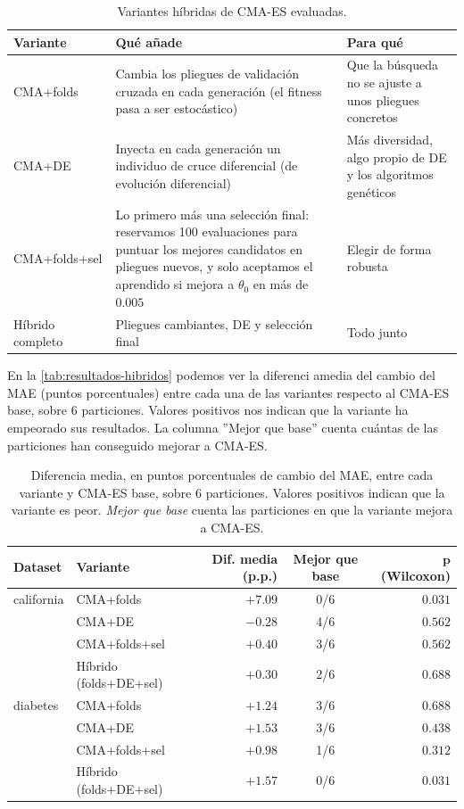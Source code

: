 \begin{table}[h]
\centering
\begin{tabular}{p{2.6cm}p{6.8cm}p{3.6cm}}
\hline
\textbf{Variante} & \textbf{Qué añade} & \textbf{Para qué} \\
\hline
CMA+folds & Cambia los pliegues de validación cruzada en cada generación (el fitness pasa a ser estocástico) & Que la búsqueda no se ajuste a unos pliegues concretos \\
\hline
CMA+DE & Inyecta en cada generación un individuo de cruce diferencial (de evolución diferencial) & Más diversidad, algo propio de DE y los algoritmos genéticos \\
\hline
CMA+folds+sel & Lo primero más una selección final: reservamos 100 evaluaciones para puntuar los mejores candidatos en pliegues nuevos, y solo aceptamos el aprendido si mejora a $\theta_0$ en más de $0.005$ & Elegir de forma robusta \\
\hline
Híbrido completo & Pliegues cambiantes, DE y selección final & Todo junto \\
\hline
\end{tabular}
\caption{Variantes híbridas de CMA-ES evaluadas.}
\label{tab:variantes-hibridas}
\end{table}

En la \autoref{tab:resultados-hibridos} podemos ver la diferenci amedia del cambio del MAE (puntos porcentuales) entre cada una de las variantes respecto al CMA-ES base, sobre 6 particiones. Valores positivos nos indican que la variante ha empeorado sus resultados. La columna ''Mejor que base'' cuenta cuántas de las particiones han conseguido mejorar a CMA-ES. 

\begin{table}[h]
\centering
\begin{tabular}{llrcr}
\hline
\textbf{Dataset} & \textbf{Variante} & \textbf{Dif. media (p.p.)} & \textbf{Mejor que base} & $\boldsymbol{p}$ \textbf{(Wilcoxon)} \\
\hline
california & CMA+folds              & $+7.09$ & 0/6 & $0.031$ \\
           & CMA+DE                 & $-0.28$ & 4/6 & $0.562$ \\
           & CMA+folds+sel          & $+0.40$ & 3/6 & $0.562$ \\
           & Híbrido (folds+DE+sel) & $+0.30$ & 2/6 & $0.688$ \\
\hline
diabetes   & CMA+folds              & $+1.24$ & 3/6 & $0.688$ \\
           & CMA+DE                 & $+1.53$ & 3/6 & $0.438$ \\
           & CMA+folds+sel          & $+0.98$ & 1/6 & $0.312$ \\
           & Híbrido (folds+DE+sel) & $+1.57$ & 0/6 & $0.031$ \\
\hline
\end{tabular}
\caption{Diferencia media, en puntos porcentuales de cambio del MAE, entre cada variante y CMA-ES base, sobre 6 particiones. Valores positivos indican que la variante es peor. \emph{Mejor que base} cuenta las particiones en que la variante mejora a CMA-ES.}
\label{tab:resultados-hibridos}
\end{table}

